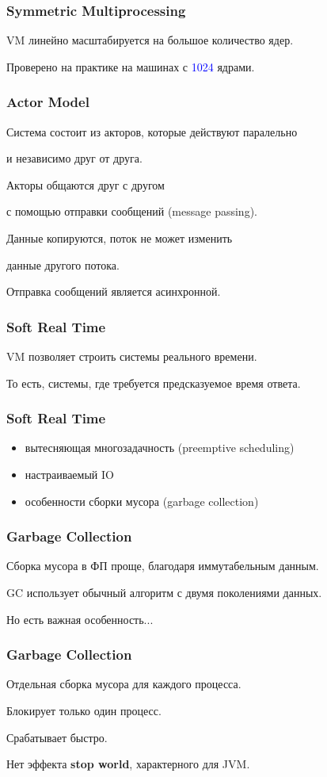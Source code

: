 \documentclass[10pt]{beamer}
\begin{document}
\begin{frame}
\frametitle{Symmetric Multiprocessing}
\centering
VM линейно масштабируется на большое количество ядер.
\par \bigskip
Проверено на практике на машинах с \textcolor{blue}{1024} ядрами.
\end{frame}

\begin{frame}
\frametitle{Actor Model}
\centering
Система состоит из акторов, которые действуют паралельно
\par
и независимо друг от друга.
\par \bigskip
Акторы общаются друг с другом
\par
с помощью отправки сообщений (message passing).
\par \bigskip
Данные копируются, поток не может изменить
\par
данные другого потока.
\par \bigskip
Отправка сообщений является асинхронной.
\end{frame}

\begin{frame}
\frametitle{Soft Real Time}
\centering
VM позволяет строить системы реального времени.
\par \bigskip
То есть, системы, где требуется предсказуемое время ответа.
\end{frame}

\begin{frame}
\frametitle{Soft Real Time}
\begin{itemize}
\item вытесняющая многозадачность (preemptive scheduling)
\item настраиваемый IO
\item особенности сборки мусора (garbage collection)
\end{itemize}
\end{frame}

\begin{frame}
\frametitle{Garbage Collection}
\centering
Сборка мусора в ФП проще, благодаря иммутабельным данным.
\par \bigskip
GC использует обычный алгоритм с двумя поколениями данных.
\par \bigskip
Но есть важная особенность...
\end{frame}

\begin{frame}
\frametitle{Garbage Collection}
\centering
Отдельная сборка мусора для каждого процесса.
\par \bigskip
Блокирует только один процесс.
\par \bigskip
Срабатывает быстро.
\par \bigskip
Нет эффекта \textbf{stop world}, характерного для JVM.
\end{frame}
\end{document}

